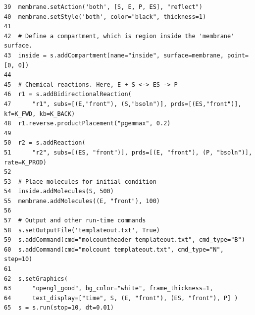 \documentclass {book}
\begin{document}
\begin{lstlisting}[style=SSAPython]
39  membrane.setAction('both', [S, E, P, ES], "reflect")
40  membrane.setStyle('both', color="black", thickness=1)
41  
42  # Define a compartment, which is region inside the 'membrane' surface.
43  inside = s.addCompartment(name="inside", surface=membrane, point=[0, 0])
44  
45  # Chemical reactions. Here, E + S <-> ES -> P
46  r1 = s.addBidirectionalReaction(
47      "r1", subs=[(E,"front"), (S,"bsoln")], prds=[(ES,"front")], kf=K_FWD, kb=K_BACK)
48  r1.reverse.productPlacement("pgemmax", 0.2)
49  
50  r2 = s.addReaction(
51      "r2", subs=[(ES, "front")], prds=[(E, "front"), (P, "bsoln")], rate=K_PROD)
52  
53  # Place molecules for initial condition
54  inside.addMolecules(S, 500)
55  membrane.addMolecules((E, "front"), 100)
56  
57  # Output and other run-time commands
58  s.setOutputFile('templateout.txt', True)
59  s.addCommand(cmd="molcountheader templateout.txt", cmd_type="B")
60  s.addCommand(cmd="molcount templateout.txt", cmd_type="N", step=10)
61  
62  s.setGraphics(
63      "opengl_good", bg_color="white", frame_thickness=1,
64      text_display=["time", S, (E, "front"), (ES, "front"), P] )
65  s = s.run(stop=10, dt=0.01)
\end{lstlisting}
\end{document}
